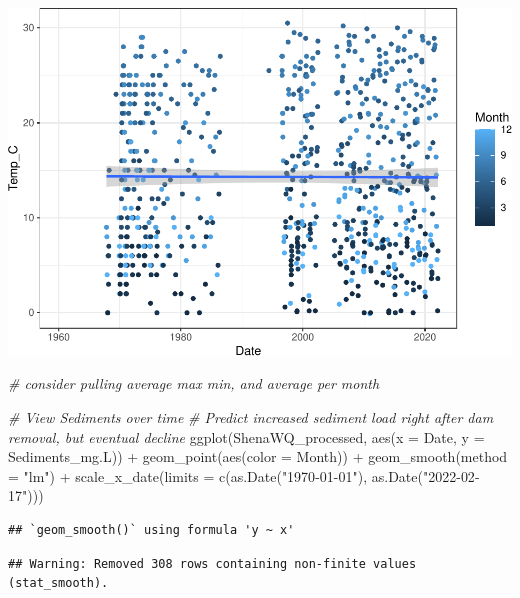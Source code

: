 \documentclass[
  12pt,
]{article}
\newenvironment{Shaded}{\begin{snugshade}}{\end{snugshade}}
\newcommand{\AttributeTok}[1]{\textcolor[rgb]{0.77,0.63,0.00}{#1}}
\newcommand{\CommentTok}[1]{\textcolor[rgb]{0.56,0.35,0.01}{\textit{#1}}}
\newcommand{\FunctionTok}[1]{\textcolor[rgb]{0.00,0.00,0.00}{#1}}
\newcommand{\NormalTok}[1]{#1}
\newcommand{\SpecialCharTok}[1]{\textcolor[rgb]{0.00,0.00,0.00}{#1}}
\newcommand{\StringTok}[1]{\textcolor[rgb]{0.31,0.60,0.02}{#1}}
\begin{document}
\includegraphics{Project_Template_files/figure-latex/unnamed-chunk-1-4.pdf}

\begin{Shaded}
\begin{Highlighting}[]
\CommentTok{\# consider pulling average max min, and average per month}

\CommentTok{\# View Sediments over time}
\CommentTok{\# Predict increased sediment load right after dam removal, but eventual decline}
\FunctionTok{ggplot}\NormalTok{(ShenaWQ\_processed, }\FunctionTok{aes}\NormalTok{(}\AttributeTok{x =}\NormalTok{ Date, }\AttributeTok{y =}\NormalTok{ Sediments\_mg.L)) }\SpecialCharTok{+}
  \FunctionTok{geom\_point}\NormalTok{(}\FunctionTok{aes}\NormalTok{(}\AttributeTok{color =}\NormalTok{ Month)) }\SpecialCharTok{+}
  \FunctionTok{geom\_smooth}\NormalTok{(}\AttributeTok{method =} \StringTok{"lm"}\NormalTok{) }\SpecialCharTok{+}
  \FunctionTok{scale\_x\_date}\NormalTok{(}\AttributeTok{limits =} \FunctionTok{c}\NormalTok{(}\FunctionTok{as.Date}\NormalTok{(}\StringTok{"1970{-}01{-}01"}\NormalTok{), }
                          \FunctionTok{as.Date}\NormalTok{(}\StringTok{"2022{-}02{-}17"}\NormalTok{)))}
\end{Highlighting}
\end{Shaded}

\begin{verbatim}
## `geom_smooth()` using formula 'y ~ x'
\end{verbatim}

\begin{verbatim}
## Warning: Removed 308 rows containing non-finite values (stat_smooth).
\end{verbatim}
\end{document}
